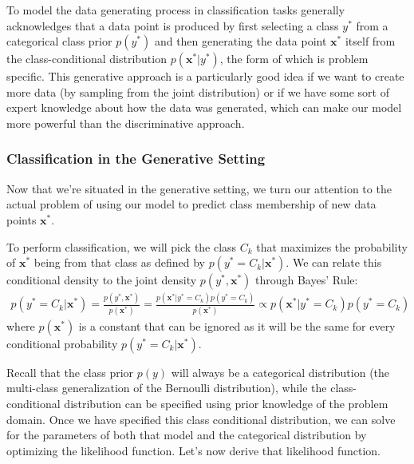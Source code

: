 To model the data generating process in classification tasks generally acknowledges that a data point is produced by first selecting a class $y^{*}$ from a categorical class prior $p(y^{*})$ and then generating the data point $\textbf{x}^{*}$ itself from the class-conditional distribution $p(\textbf{x}^{*}|y^{*})$, the form of which is problem specific. This generative approach is a particularly good idea if we want to create more data (by sampling from the joint distribution) or if we have some sort of expert knowledge about how the data was generated, which can make our model more powerful than the discriminative approach.


\subsubsection{Classification in the Generative Setting}
Now that we're situated in the generative setting, we turn our attention to the actual problem of using our model to predict class membership of new data points $\textbf{x}^{*}$.

To perform classification, we will pick the class $C_{k}$ that maximizes the probability of $\textbf{x}^{*}$ being from that class as defined by $p(y^{*} = C_{k} | \textbf{x}^{*})$. We can relate this conditional density to the joint density $p(y^{*}, \textbf{x}^{*})$ through Bayes' Rule:
\begin{align*}
	p(y^{*} = C_{k} | \textbf{x}^{*}) = \frac{p(y^{*}, \textbf{x}^{*})}{p(\textbf{x}^{*})} = \frac{p(\textbf{x}^{*} | y^{*} = C_{k})p(y^{*} = C_{k})}{p(\textbf{x}^{*})} \propto p(\textbf{x}^{*} | y^{*} = C_{k})p(y^{*} = C_{k})
\end{align*}
where $p(\textbf{x}^{*})$ is a constant that can be ignored as it will be the same for every conditional probability $p(y^{*} = C_{k}|\textbf{x}^{*})$.

Recall that the class prior $p(y)$ will always be a categorical distribution (the multi-class generalization of the Bernoulli distribution), while the class-conditional distribution can be specified using prior knowledge of the problem domain. Once we have specified this class conditional distribution, we can solve for the parameters of both that model and the categorical distribution by optimizing the likelihood function. Let's now derive that likelihood function.

